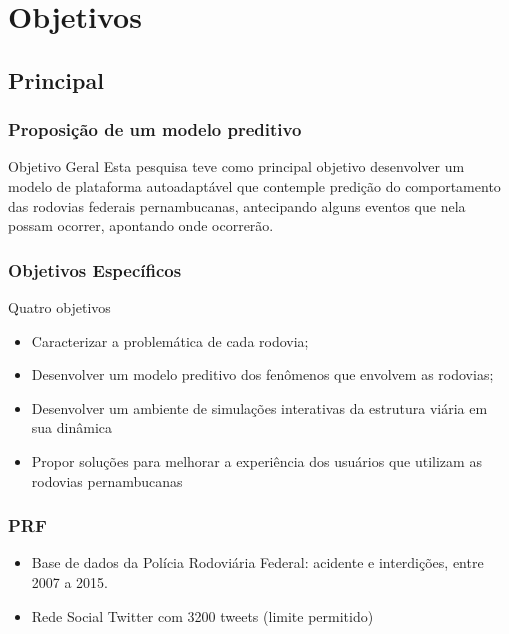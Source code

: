 \documentclass[11pt]{beamer}
\begin{document}
\section{ Objetivos}
\subsection*{ Principal}

\begin{frame}\frametitle{Proposição de um modelo preditivo}
	\pause
	\begin{block}{ Objetivo Geral}
		Esta pesquisa teve como principal objetivo desenvolver um modelo de plataforma autoadaptável 
		\pause que contemple predição do comportamento das rodovias federais pernambucanas,
		\pause antecipando alguns eventos que nela possam ocorrer, apontando onde ocorrerão.
		
	\end{block}
\end{frame}

\begin{frame}\frametitle{ Objetivos Específicos}
	\pause
	\begin{block}{ Quatro objetivos}
		\begin{itemize}
			\item Caracterizar a problemática de cada rodovia;

			\item Desenvolver um modelo preditivo dos fenômenos que envolvem as rodovias;

			\item Desenvolver um ambiente de simulações interativas da estrutura viária em sua dinâmica
			
			\item Propor soluções para melhorar a experiência dos usuários que utilizam as rodovias pernambucanas
		\end{itemize}
		
	\end{block}
\end{frame}

\begin{frame}\frametitle{PRF}
	\begin{itemize}
		\item Base de dados da Polícia Rodoviária Federal: acidente e interdições, entre 2007 a 2015.
		\pause
		\item Rede Social Twitter com 3200 tweets (limite permitido)
	\end{itemize}	
\end{frame}
\end{document}
